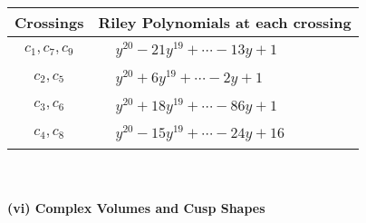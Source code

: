 \documentclass[1p]{elsarticle_modified}
\theoremstyle{definition}
\begin{document}
\begin{tabular}{m{50pt}|m{274pt}}
Crossings & \hspace{64pt}Riley Polynomials at each crossing \\
\hline $$\begin{aligned}c_{1},c_{7},c_{9}\end{aligned}$$&$\begin{aligned}
&y^{20}-21 y^{19}+\cdots-13 y+1
\end{aligned}$\\
\hline $$\begin{aligned}c_{2},c_{5}\end{aligned}$$&$\begin{aligned}
&y^{20}+6 y^{19}+\cdots-2 y+1
\end{aligned}$\\
\hline $$\begin{aligned}c_{3},c_{6}\end{aligned}$$&$\begin{aligned}
&y^{20}+18 y^{19}+\cdots-86 y+1
\end{aligned}$\\
\hline $$\begin{aligned}c_{4},c_{8}\end{aligned}$$&$\begin{aligned}
&y^{20}-15 y^{19}+\cdots-24 y+16
\end{aligned}$\\
\hline
\end{tabular}\\~\\
\newpage\flushleft \textbf{(vi) Complex Volumes and Cusp Shapes}
\end{document}
